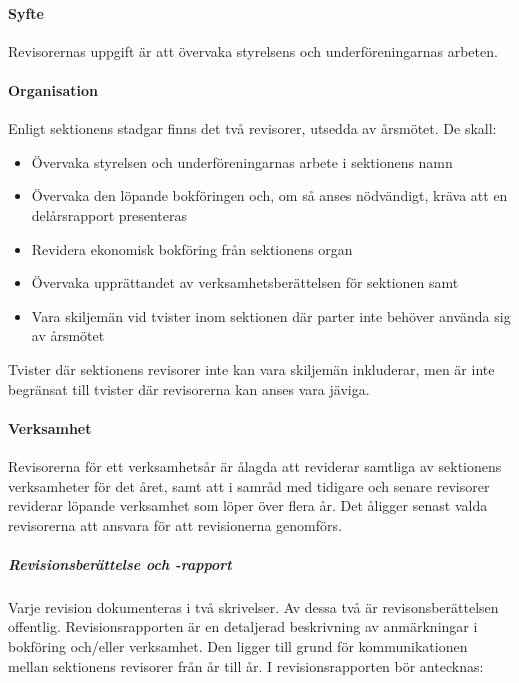 \documentclass{../resources/dgovdoc}
\begin{document}
\paragraph{Syfte}

Revisorernas uppgift är att övervaka styrelsens och underföreningarnas arbeten.

\paragraph{Organisation}

Enligt sektionens stadgar finns det två revisorer, utsedda av årsmötet. De skall:

\begin{itemize}
\item Övervaka styrelsen och underföreningarnas arbete i sektionens namn
\item Övervaka den löpande bokföringen och, om så anses nödvändigt, kräva att en delårsrapport presenteras
\item Revidera ekonomisk bokföring från sektionens organ
\item Övervaka upprättandet av verksamhetsberättelsen för sektionen samt 
\item Vara skiljemän vid tvister inom sektionen där parter inte behöver använda sig av årsmötet
\end{itemize}

Tvister där sektionens revisorer inte kan vara skiljemän inkluderar,
men är inte begränsat till tvister där revisorerna kan anses vara jäviga. 

\paragraph{Verksamhet}

Revisorerna för ett verksamhetsår är ålagda att reviderar samtliga av sektionens verksamheter
för det året, samt att i samråd med tidigare och senare revisorer reviderar löpande verksamhet som löper över flera år.
Det åligger senast valda revisorerna att ansvara för att revisionerna genomförs.

\subparagraph{Revisionsberättelse och -rapport} 

Varje revision dokumenteras i två skrivelser. Av dessa två är revisonsberättelsen offentlig. 
Revisionsrapporten är en detaljerad beskrivning av anmärkningar i bokföring och/eller verksamhet.
Den ligger till grund för kommunikationen mellan sektionens revisorer från år till år. I revisionsrapporten bör antecknas:
\end{document}
